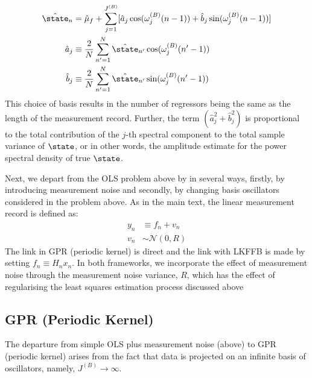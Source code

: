 \begin{align}
\hat{\state}_n &= \hat{\mu}_f  + \sum_{j=1}^{J^{(B)}}  [\hat{a}_j \cos(\omega_j^{(B)} (n-1)) +  \hat{b}_j \sin(\omega_j^{(B)} (n-1)) ] \\
\hat{a}_j &\equiv \frac{2}{N} \sum_{n'=1}^{N} \hat{\state}_{n'} \cos(\omega_j^{(B)}(n'-1)) \\
\hat{b}_j &\equiv \frac{2}{N} \sum_{n'=1}^{N} \hat{\state}_{n'} \sin(\omega_j^{(B)}(n'-1))
\end{align}
This choice of basis results in the number of regressors being the same as the length of the measurement record. Further, the term $(\hat{a}_j^2 + \hat{b}_j^2)$ is proportional to the total contribution of the $j$-th spectral component to the total sample variance of $\state$, or in other words, the amplitude estimate for the power spectral density of true $\state$.

Next, we depart from the OLS problem above by in several ways, firstly, by introducing measurement noise and secondly, by changing basis oscillators considered in the problem above. As in the main text, the linear measurement record is defined as:
\begin{align}
y_n &\equiv  f_n + v_n \\
v_n & \sim \mathcal{N}(0, R)
\end{align}
The link in GPR (periodic kernel) is direct and the link with LKFFB is made by setting $f_n \equiv H_nx_n$. In both frameworks, we incorporate the effect of measurement noise through the measurement noise variance, $R$, which has the effect of regularising the least squares estimation process discussed above \cite{west1996bayesian}

\subsection{GPR (Periodic Kernel)}\label{sec:ap_approxSP:GPRPKernel}

The departure from simple OLS plus measurement noise (above) to GPR (periodic kernel) arises from the fact that data is projected on an infinite basis of oscillators, namely, $J^{(B)} \to \infty$.

